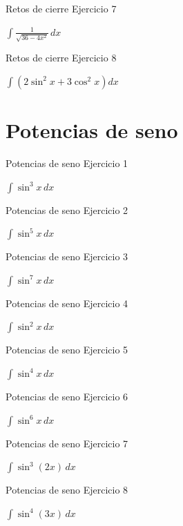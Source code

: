 \documentclass[10pt,aspectratio=169]{beamer}
\newcommand{\ejercicio}[1]{%
  \begin{center}
  \vfill
  {\fontsize{24}{30}\selectfont #1}
  \vfill
  \end{center}
}
\begin{document}
\begin{frame}{Retos de cierre}
\small Ejercicio 7
\ejercicio{$\displaystyle \int\frac{1}{\sqrt{36-4x^2}}\,dx$}
\end{frame}

\begin{frame}{Retos de cierre}
\small Ejercicio 8
\ejercicio{$\displaystyle \int\left(2\sin^2x+3\cos^2x\right)dx$}
\end{frame}


\section{Potencias de seno}
\begin{frame}{Potencias de seno}
\small Ejercicio 1
\ejercicio{$\displaystyle \int \sin^3 x\,dx$}
\end{frame}
\begin{frame}{Potencias de seno}
\small Ejercicio 2
\ejercicio{$\displaystyle \int \sin^5 x\,dx$}
\end{frame}
\begin{frame}{Potencias de seno}
\small Ejercicio 3
\ejercicio{$\displaystyle \int \sin^7 x\,dx$}
\end{frame}
\begin{frame}{Potencias de seno}
\small Ejercicio 4
\ejercicio{$\displaystyle \int \sin^2 x\,dx$}
\end{frame}
\begin{frame}{Potencias de seno}
\small Ejercicio 5
\ejercicio{$\displaystyle \int \sin^4 x\,dx$}
\end{frame}
\begin{frame}{Potencias de seno}
\small Ejercicio 6
\ejercicio{$\displaystyle \int \sin^6 x\,dx$}
\end{frame}
\begin{frame}{Potencias de seno}
\small Ejercicio 7
\ejercicio{$\displaystyle \int \sin^3(2x)\,dx$}
\end{frame}
\begin{frame}{Potencias de seno}
\small Ejercicio 8
\ejercicio{$\displaystyle \int \sin^4(3x)\,dx$}
\end{frame}

\end{document}
